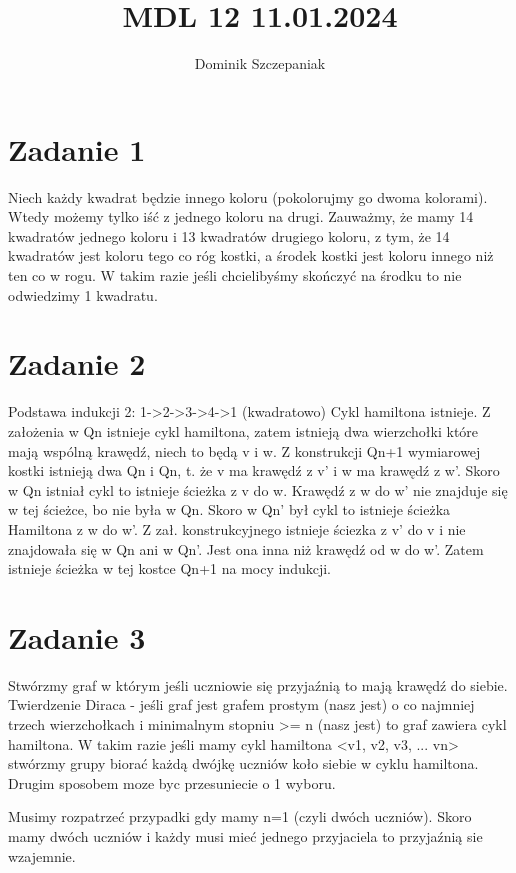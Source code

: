 \documentclass[12pt]{article}
\title{MDL 12 11.01.2024}
\author{Dominik Szczepaniak}
\begin{document}
\maketitle

\bgroup\obeylines
\section{Zadanie 1} %
Niech każdy kwadrat będzie innego koloru (pokolorujmy go dwoma kolorami). Wtedy możemy tylko iść z jednego koloru na drugi. Zauważmy, że mamy 14 kwadratów jednego koloru i 13 kwadratów drugiego koloru, z tym, że 14 kwadratów jest koloru tego co róg kostki, a środek kostki jest koloru innego niż ten co w rogu. W takim razie jeśli chcielibyśmy skończyć na środku to nie odwiedzimy 1 kwadratu.
\section{Zadanie 2} %
Podstawa indukcji 2:
1->2->3->4->1  (kwadratowo)
Cykl hamiltona istnieje.
Z założenia w Qn istnieje cykl hamiltona, zatem istnieją dwa wierzchołki które mają wspólną krawędź, niech to będą v i w.
Z konstrukcji Qn+1 wymiarowej kostki istnieją dwa Qn i Qn, t. że v ma krawędź z v' i w ma krawędź z w'. Skoro w Qn istniał cykl to istnieje ścieżka z v do w. Krawędź z w do w' nie znajduje się w tej ścieżce, bo nie była w Qn. Skoro w Qn' był cykl to istnieje ścieżka Hamiltona z w do w'. Z zał. konstrukcyjnego istnieje ściezka z v' do v i nie znajdowała się w Qn ani w Qn'. Jest ona inna niż krawędź od w do w'. Zatem istnieje ścieżka w tej kostce Qn+1 na mocy indukcji. 
\section{Zadanie 3} %
Stwórzmy graf w którym jeśli uczniowie się przyjaźnią to mają krawędź do siebie.
Twierdzenie Diraca - jeśli graf jest grafem prostym (nasz jest) o co najmniej trzech wierzchołkach i minimalnym stopniu >= n (nasz jest) to graf zawiera cykl hamiltona.
W takim razie jeśli mamy cykl hamiltona <v1, v2, v3, ... vn> stwórzmy grupy biorać każdą dwójkę uczniów koło siebie w cyklu hamiltona. Drugim sposobem moze byc przesuniecie o 1 wyboru.

Musimy rozpatrzeć przypadki gdy mamy n=1 (czyli dwóch uczniów). Skoro mamy dwóch uczniów i każdy musi mieć jednego przyjaciela to przyjaźnią sie wzajemnie.
\end{document}
